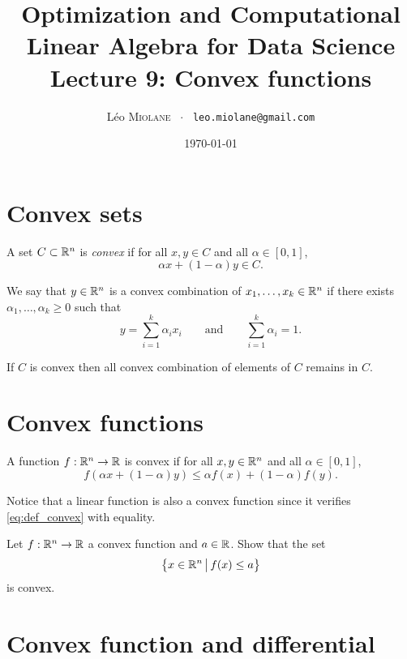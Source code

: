 \documentclass[11pt,nocut]{article}
\title{\vspace{-2.0cm}%
	Optimization and Computational Linear Algebra for Data Science\\
Lecture 9: Convex functions}
\author{Léo \textsc{Miolane} \ $\cdot$ \ \texttt{leo.miolane@gmail.com}}
\date{\today}
\begin{document}
\maketitle


\section{Convex sets}

\begin{definition}
	A set $C \subset \mathbb{R}^n$ is \emph{convex} if for all $x,y \in C$ and all $\alpha \in [0,1]$,
	$$
	\alpha x + (1-\alpha) y \in C.
	$$
\end{definition}

\begin{definition}
	We say that $y \in \mathbb{R}^n$ is a convex combination of $x_1, \dots, x_k \in \mathbb{R}^n$ if there exists $\alpha_1, \dots, \alpha_k \geq 0$ such that
	$$
	y = \sum_{i=1}^k \alpha_i x_i \qquad \text{and} \qquad \sum_{i=1}^k \alpha_i = 1.
	$$
\end{definition}

\begin{proposition}
	If $C$ is convex then all convex combination of elements of $C$ remains in $C$.
\end{proposition}

\section{Convex functions}

\begin{definition}
	A function $f: \mathbb{R}^n \to \mathbb{R}$ is convex if for all $x,y \in \mathbb{R}^n$ and all $\alpha \in [0,1]$,
	\begin{equation}\label{eq:def_convex}
	f(\alpha x + (1-\alpha) y) \leq \alpha f(x) + (1-\alpha) f(y).
\end{equation}
\end{definition}

Notice that a linear function is also a convex function since it verifies \eqref{eq:def_convex} with equality.

\begin{exercise}
	Let $f : \mathbb{R}^n \to \mathbb{R}$ a convex function and $a \in \mathbb{R}$. Show that the set 
	$$
	\big\{ x \in \mathbb{R}^n \, \big| \, f(x) \leq a \big\}
	$$
	is convex.
\end{exercise}

\section{Convex function and differential}
\end{document}
